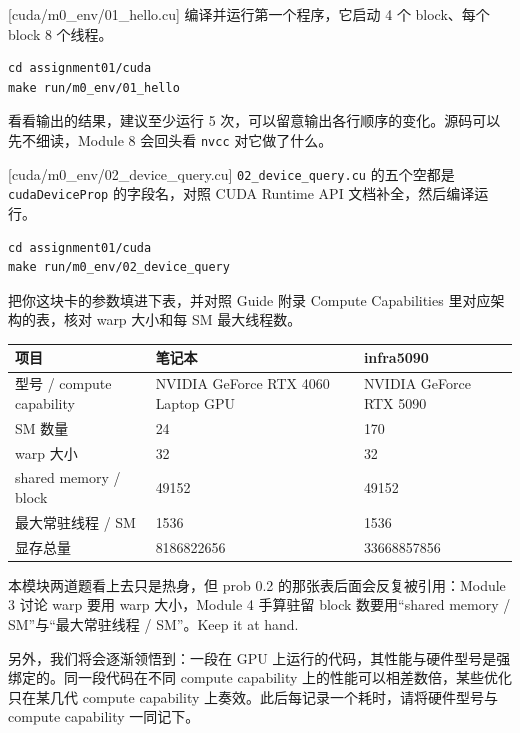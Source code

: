 \documentclass[11pt,a4paper,fontset=none]{ctexart}
\begin{document}
[cuda/m0\_env/01\_hello.cu]
编译并运行第一个程序，它启动 4 个 block、每个 block 8 个线程。

\begin{lstlisting}
cd assignment01/cuda
make run/m0_env/01_hello
\end{lstlisting}

看看输出的结果，建议至少运行 5 次，可以留意输出各行顺序的变化。源码可以先不细读，Module 8 会回头看 \texttt{nvcc} 对它做了什么。

[cuda/m0\_env/02\_device\_query.cu]
\texttt{02\_device\_query.cu} 的五个空都是 \texttt{cudaDeviceProp} 的字段名，对照 CUDA Runtime API 文档补全，然后编译运行。

\begin{lstlisting}
cd assignment01/cuda
make run/m0_env/02_device_query
\end{lstlisting}

把你这块卡的参数填进下表，并对照 Guide 附录 Compute Capabilities 里对应架构的表，核对 warp 大小和每 SM 最大线程数。

\begin{center}\small
  \begin{tabular}{@{}lll@{}}
    \toprule
    项目                      & 笔记本                                & infra5090               \\
    \midrule
    型号 / compute capability & NVIDIA GeForce RTX 4060 Laptop GPU & NVIDIA GeForce RTX 5090 \\
    SM 数量                   & 24                                 & 170                     \\
    warp 大小                 & 32                                 & 32                      \\
    shared memory / block   & 49152                              & 49152                   \\
    最大常驻线程 / SM             & 1536                               & 1536                    \\
    显存总量                    & 8186822656                         & 33668857856             \\
    \bottomrule
  \end{tabular}
\end{center}

\begin{lookback}
  本模块两道题看上去只是热身，但 prob 0.2 的那张表后面会反复被引用：Module 3 讨论 warp 要用 warp 大小，Module 4 手算驻留 block 数要用“shared memory / SM”与“最大常驻线程 / SM”。Keep it at hand.

  另外，我们将会逐渐领悟到：一段在 GPU 上运行的代码，其性能与硬件型号是强绑定的。同一段代码在不同 compute capability 上的性能可以相差数倍，某些优化只在某几代 compute capability 上奏效。此后每记录一个耗时，请将硬件型号与 compute capability 一同记下。
\end{lookback}
\end{document}
